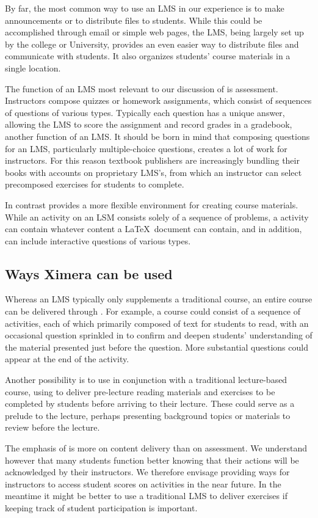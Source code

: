 \documentclass{ximera}
\begin{document}
By far, the most common way to use an LMS in our experience is to make
announcements or to distribute files to students.  While this could be
accomplished through email or simple web pages, the LMS, being largely
set up by the college or University, provides an even easier way to
distribute files and communicate with students.  It also organizes
students' course materials in a single location.

The function of an LMS most relevant to our discussion of
 is assessment.  Instructors
compose quizzes or homework assignments, which consist of sequences of
questions of various types.  Typically each question has a unique
answer, allowing the LMS to score the assignment and record grades in
a gradebook, another function of an LMS.  It should be born in mind
that composing questions for an LMS, particularly multiple-choice
questions, creates a lot of work for instructors. For this reason
textbook publishers are increasingly bundling their books with
accounts on proprietary LMS's, from which an instructor can select
precomposed exercises for students to complete.

In contrast  provides a more
flexible environment for creating course materials.  While an activity
on an LSM consists solely of a sequence of problems, a
 activity can contain whatever
content a \LaTeX\ document can contain, and in addition, can include
interactive questions of various types.

\subsection{Ways Ximera can be used}
Whereas an LMS typically only supplements a traditional course, an
entire course can be delivered through
.  For example, a course could
consist of a sequence of 
activities, each of which primarily composed of text for students to
read, with an occasional question sprinkled in to confirm and deepen
students' understanding of the material presented just before the
question.  More substantial questions could appear at the end of the
activity.

Another possibility is to use  in
conjunction with a traditional lecture-based course, using
 to deliver pre-lecture
reading materials and exercises to be completed by students before
arriving to their lecture.  These could serve as a prelude to the
lecture, perhaps presenting background topics or materials to review
before the lecture.

The emphasis of 
is more on content delivery than on assessment.
We understand however that many students function
better knowing that their actions will be acknowledged by
their instructors. We therefore envisage providing ways
for instructors to access student scores on 
 activities
in the near future. In the meantime it might
be better to use a traditional LMS to deliver exercises
if keeping track of student participation is important.
\end{document}
